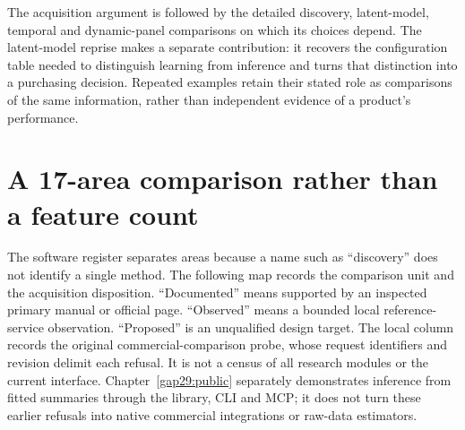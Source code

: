 The acquisition argument is followed by the detailed discovery, latent-model,
temporal and dynamic-panel comparisons on which its choices depend. The
latent-model reprise makes a separate contribution: it recovers the configuration
table needed to distinguish learning from inference and turns that distinction
into a purchasing decision. Repeated examples retain their stated role as
comparisons of the same information, rather than independent evidence of a
product's performance.

\section{A 17-area comparison rather than a feature count}
\label{exec17:s8-map}

The software register separates areas because a name such as ``discovery''
does not identify a single method. The following map records the comparison
unit and the acquisition disposition. ``Documented'' means supported by an
inspected primary manual or official page. ``Observed'' means a bounded local
reference-service observation. ``Proposed'' is an unqualified design target.
The local column records the original commercial-comparison probe, whose
request identifiers and revision delimit each refusal. It is not a census of
all research modules or the current interface. Chapter~\ref{gap29:public}
separately demonstrates inference from fitted summaries through the library,
CLI and MCP; it does not turn these earlier refusals into native commercial
integrations or raw-data estimators.

